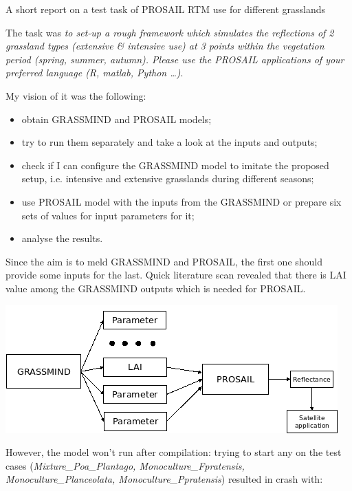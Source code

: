 \documentclass[a4paper,12pt]{article}
\renewcommand{\baselinestretch}{1.25}
\begin{document}
\renewcommand{\baselinestretch}{1.3}\selectfont
\pagestyle{empty}
{
\huge
\begin{center}
A short report on a test task of PROSAIL RTM use for different grasslands
\end{center}
}

\vspace{5mm}

The task was \textit{to set-up a rough framework which simulates the reflections of 2 grassland types (extensive \& intensive use) at 3 points within the vegetation period (spring, summer, autumn). Please use the PROSAIL applications of your preferred language (R, matlab, Python \ldots)}.

My vision of it was the following:
\begin{itemize}
	\item obtain GRASSMIND and PROSAIL models;
	\item try to run them separately and take a look at the inputs and outputs;
	\item check if I can configure the GRASSMIND model to imitate the proposed setup, i.e. intensive and extensive grasslands during different seasons;
	\item use PROSAIL model with the inputs from the GRASSMIND or prepare six sets of values for input parameters for it;
	\item analyse the results.
\end{itemize}

Since the aim is to meld GRASSMIND and PROSAIL, the first one should provide some inputs for the last. Quick literature scan revealed that there is LAI value among the GRASSMIND outputs which is needed for PROSAIL. 

\begin{center}
	\includegraphics[width=0.8\linewidth]{../figs/Diagram1.png} \\
\end{center}

However, the model won't run after compilation: trying to start any on the test cases (\textit{Mixture\_Poa\_Plantago, Monoculture\_Fpratensis, Monoculture\_Planceolata, Monoculture\_Ppratensis}) resulted in crash with: \pagebreak
\end{document}
